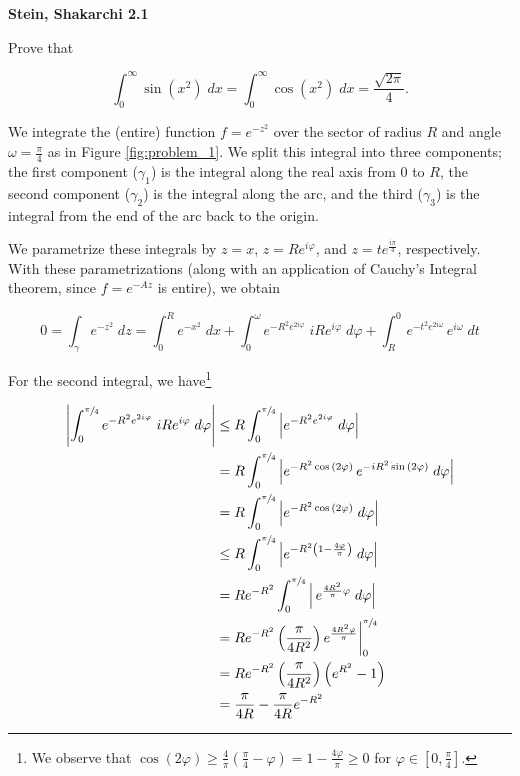 \textbf{Stein, Shakarchi 2.1}

Prove that 

$$
\int_{0}^{\infty}{\sin{\left( x^2 \right)} \; dx} = \int_{0}^{\infty}{\cos{\left( x^2 \right)} \; dx} 
                                                  = \frac{\sqrt{2\pi}}{4}.
$$

\begin{solution}
    We integrate the (entire) function $f = e^{-z^2}$ over the sector of radius $R$ and angle $\omega = \frac{\pi}{4}$
    as in Figure \ref{fig:problem_1}. We split this integral into three components; the first component 
    ($\gamma_1$) is the integral along the real axis from $0$ to $R$, the second component ($\gamma_2$) is the integral 
    along the arc, and the third ($\gamma_3$) is the integral from the end of the arc back to the origin. 
 
    We parametrize these integrals by $z = x$, $z = Re^{i\varphi}$, and $z = t e^{\frac{i \pi}{4}}$, respectively. With 
    these parametrizations (along with an application of Cauchy's Integral theorem, since $f = e^{-Az}$ is entire), we 
    obtain

    $$
    0 = \int_{\gamma} {e^{-z^2}} \; dz = \int_{0}^{R} {e^{-x^2}} \; dx + \int_{0}^{\omega} {e^{-R^2 e^{2 i\varphi}} \; iRe^{i\varphi}} \; d\varphi + \int_{R}^{0} {e^{-t^2 e^{2 i\omega}} \, e^{i\omega}} \; dt
    $$

    For the second integral, we have\footnote{
        We observe that 
        $\cos{(2\varphi)} \ge \frac{4}{\pi} \left( \frac{\pi}{4} - \varphi \right) = 1 - \frac{4\varphi}{\pi} \ge 0$ for 
        $\varphi \in \left[0, \frac{\pi}{4}\right]$.
    }

    \begin{align*}
        \left| \int_0^{\sfrac{\pi}{4}} {e^{-R^2 e^{2 i \varphi}} \; i R e^{i \varphi}} \; d\varphi \right|
        &\le R \int_0^{\sfrac{\pi}{4}} {\left| e^{-R^2 e^{2 i \varphi}} \; d\varphi \right|} \\
        &=   R \int_0^{\sfrac{\pi}{4}} {\left| e^{-R^2 \cos{(2 \varphi)}} \, e^{-i R^2 \sin{(2 \varphi)}} \; d\varphi \right|} \\
        &=   R \int_0^{\sfrac{\pi}{4}} {\left| e^{-R^2 \cos{(2 \varphi)}} \; d\varphi \right|} \\
        &\le R \int_0^{\sfrac{\pi}{4}} {\left| e^{-R^2 \left(1 - \frac{4 \varphi}{\pi}\right)} \; d\varphi \right|} \\
        &=   R e^{-R^2} \int_0^{\sfrac{\pi}{4}} {\left| \, e^{\frac{4 R^2}{\pi} \varphi} \; d\varphi \right|} \\
        &=   R e^{-R^2} \left( \frac{\pi}{4 R^2} \right) e^{\frac{4 R^2 \varphi}{\pi}} \bigg|_0^{\sfrac{\pi}{4}} \\
        &=   R e^{-R^2} \left( \frac{\pi}{4 R^2} \right) \left(e^{R^2} - 1 \right) \\
        &=   \frac{\pi}{4 R} - \frac{\pi}{4 R} e^{-R^2} \\
    \end{align*}


\end{solution}
